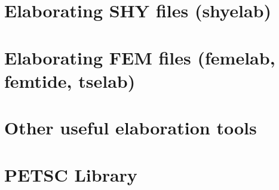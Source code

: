\documentclass{report}
\begin{document}
	\section{Elaborating SHY files (shyelab)}


	\section{Elaborating FEM files (femelab, femtide, tselab)}
	


	\section{Other useful elaboration tools}
	\label{postproc_prg}
      

	\section{PETSC Library}
	\label{PETSC}
      



\end{document}
